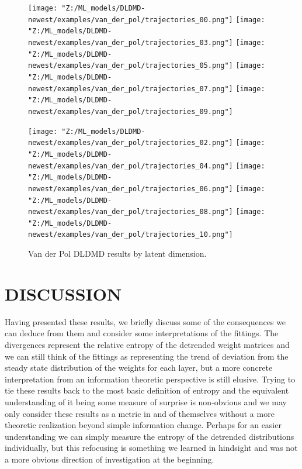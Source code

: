 \begin{figure}[!htbp]
    \centering
    \begin{minipage}{.5\textwidth}
        \texttt{[image: "Z:/ML\_models/DLDMD-newest/examples/van\_der\_pol/trajectories\_00.png"]} 
        \texttt{[image: "Z:/ML\_models/DLDMD-newest/examples/van\_der\_pol/trajectories\_03.png"]} 
        \texttt{[image: "Z:/ML\_models/DLDMD-newest/examples/van\_der\_pol/trajectories\_05.png"]} 
        \texttt{[image: "Z:/ML\_models/DLDMD-newest/examples/van\_der\_pol/trajectories\_07.png"]} 
        \texttt{[image: "Z:/ML\_models/DLDMD-newest/examples/van\_der\_pol/trajectories\_09.png"]} 
    \end{minipage}%
    \begin{minipage}{.5\textwidth}
        \texttt{[image: "Z:/ML\_models/DLDMD-newest/examples/van\_der\_pol/trajectories\_02.png"]} 
        \texttt{[image: "Z:/ML\_models/DLDMD-newest/examples/van\_der\_pol/trajectories\_04.png"]} 
        \texttt{[image: "Z:/ML\_models/DLDMD-newest/examples/van\_der\_pol/trajectories\_06.png"]} 
        \texttt{[image: "Z:/ML\_models/DLDMD-newest/examples/van\_der\_pol/trajectories\_08.png"]} 
        \texttt{[image: "Z:/ML\_models/DLDMD-newest/examples/van\_der\_pol/trajectories\_10.png"]} 
    \end{minipage}
    \caption{Van der Pol DLDMD results by latent dimension.}
    \label{fig:van der pol DLDMD results}
\end{figure}

\chapter{DISCUSSION}
\label{chap:discussion}
Having presented these results, we briefly discuss some of the consequences we can deduce from 
them and consider some interpretations of the fittings. The divergences represent the relative
entropy of the detrended weight matrices and we can still think of the fittings as representing
the trend of deviation from the steady state distribution of the weights for each layer, but a more
concrete interpretation from an information theoretic perspective is still elusive. Trying to tie 
these results back to the most basic definition of entropy and the equivalent understanding of it 
being some measure of surprise is non-obvious and we may only consider these results as a metric in
and of themselves without a more theoretic realization beyond simple information change. Perhaps for 
an easier understanding we can simply measure the entropy of the detrended distributions individually,
but this refocusing is something we learned in hindsight and was not a more obvious direction of 
investigation at the beginning.

